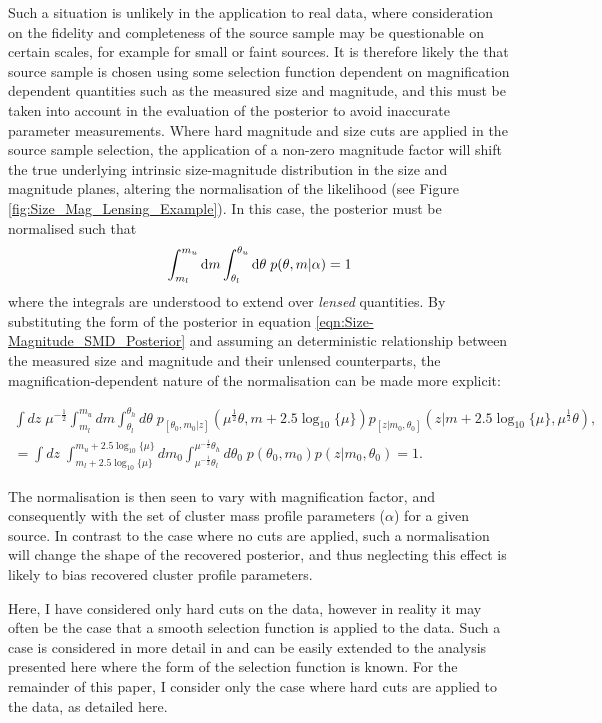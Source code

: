 \documentclass[useAMS,usenatbib,times,letter,amssymb]{mn2e}
\def\be{\begin{equation}}
\def\ee{\end{equation}}
\def\bea{\begin{eqnarray}}
\def\eea{\end{eqnarray}}
\begin{document}
Such a situation is unlikely in the application to real data, where consideration on the fidelity and completeness of the source sample may be questionable on certain scales, for example for small or faint sources. It is therefore likely the that source sample is chosen using some selection function dependent on magnification dependent quantities such as the measured size and magnitude, and this must be taken into account in the evaluation of the posterior to avoid inaccurate parameter measurements. Where hard magnitude and size cuts are applied in the source sample selection, the application of a non-zero magnitude factor will shift the true underlying intrinsic size-magnitude distribution in the size and magnitude planes, altering the normalisation of the likelihood (see Figure \ref{fig:Size_Mag_Lensing_Example}). In this case, the posterior must be normalised such that
\be
\int^{m_u}_{m_l} {\rm d} m \int^{\theta_u}_{\theta_l} {\rm d}\theta \; p(\theta,m|\alpha) =  1
\ee
where the integrals are understood to extend over {\it lensed} quantities. By substituting the form of the posterior in equation \ref{eqn:Size-Magnitude_SMD_Posterior} and assuming an deterministic relationship between the measured size and magnitude and their unlensed counterparts, the magnification-dependent nature of the normalisation can be made more explicit:
\begin{widetext}
\bea
\int dz\; \mu^{-\frac{1}{2}} \int_{m_l}^{m_u} dm\int_{\theta_l}^{\theta_h} d\theta\; p_{[\theta_0, m_0|z]}\left(\mu^{\frac{1}{2}}\theta,m+2.5\log_{10}\{\mu\}\right) p_[z|m_0,\theta_0](z|m+2.5\log_{10}\{\mu\}, \mu^{\frac{1}{2}}\theta), \nonumber\\
= \int dz\; \int_{m_l+2.5\log_{10}\{\mu\}}^{m_u+2.5\log_{10}\{\mu\}} dm_0\int_{\mu^{-\frac{1}{2}}\theta_l}^{\mu^{-\frac{1}{2}}\theta_h} d\theta_0\;p\left(\theta_0,m_0\right)p(z|m_0, \theta_0) = 1. \nonumber
\eea
\end{widetext}
The normalisation is then seen to vary with magnification factor, and consequently with the set of cluster mass profile parameters ($\alpha$) for a given source. In contrast to the case where no cuts are applied, such a normalisation will change the shape of the recovered posterior, and thus neglecting this effect is likely to bias recovered cluster profile parameters.

Here, I have considered only hard cuts on the data, however in reality it may often be the case that a smooth selection function is applied to the data. Such a case is considered in more detail in \cite{Alsing:2014p2846} and can be easily extended to the analysis presented here where the form of the selection function is known. For the remainder of this paper, I consider only the case where hard cuts are applied to the data, as detailed here.
\end{document}
